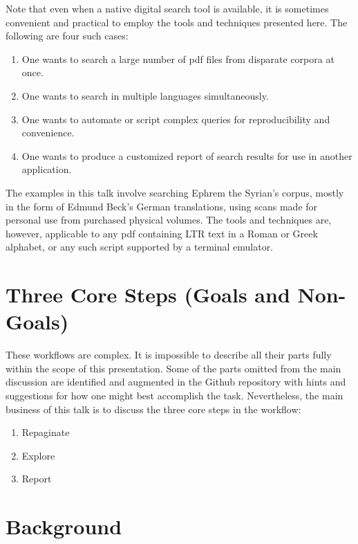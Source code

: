 \documentclass[
  letterpaper,
]{tufte-handout}
\providecommand{\tightlist}{%
  \setlength{\itemsep}{0pt}\setlength{\parskip}{0pt}}
\begin{document}
Note that even when a native digital search tool is available, it is
sometimes convenient and practical to employ the tools and techniques
presented here. The following are four such cases:

\begin{enumerate}
\def\labelenumi{\arabic{enumi}.}
\tightlist
\item
  One wants to search a large number of pdf files from disparate corpora
  at once.
\item
  One wants to search in multiple languages simultaneously.
\item
  One wants to automate or script complex queries for reproducibility
  and convenience.
\item
  One wants to produce a customized report of search results for use in
  another application.
\end{enumerate}

The examples in this talk involve searching Ephrem the Syrian's corpus,
mostly in the form of Edmund Beck's German translations, using scans
made for personal use from purchased physical volumes. The tools and
techniques are, however, applicable to any pdf containing LTR text in a
Roman or Greek alphabet, or any such script supported by a terminal
emulator.

\section{Three Core Steps (Goals and
Non-Goals)}\label{three-core-steps-goals-and-non-goals}

These workflows are complex. It is impossible to describe all their
parts fully within the scope of this presentation. Some of the parts
omitted from the main discussion are identified and augmented in the
Github repository with hints and suggestions for how one might best
accomplish the task. Nevertheless, the main business of this talk is to
discuss the three core steps in the workflow:

\begin{enumerate}
\def\labelenumi{\arabic{enumi}.}
\tightlist
\item
  Repaginate
\item
  Explore
\item
  Report
\end{enumerate}

\section{Background}\label{background}
\end{document}

